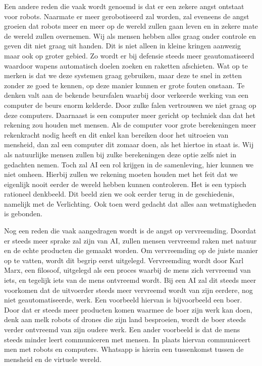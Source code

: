 \documentclass{article}
\begin{document}
Een andere reden die vaak wordt genoemd is dat er een zekere angst ontstaat voor robots. Naarmate er meer gerobotiseerd zal worden, zal eveneens de angst groeien dat robots meer en meer op de wereld zullen gaan leven en in zekere mate de wereld zullen overnemen. Wij als mensen hebben alles graag onder controle en geven dit niet graag uit handen. Dit is niet alleen in kleine kringen aanwezig maar ook op groter gebied. Zo wordt er bij defensie steeds meer geautomatiseerd waardoor wapens automatisch doelen zoeken en raketten afschieten. Wat op te merken is dat we deze systemen graag gebruiken, maar deze te snel in zetten zonder ze goed te kennen, op deze manier kunnen er grote fouten onstaan. Te denken valt aan de bekende beursfalen\cite{vriendofvijand} waarbij door verkeerde werking van een computer de beurs enorm kelderde. Door zulke falen vertrouwen we niet graag op deze computers. Daarnaast is een computer meer gericht op techniek dan dat het rekening zou houden met mensen. Als de computer voor grote berekeningen meer rekenkracht nodig heeft en dit enkel kan bereiken door het uitroeien van mensheid, dan zal een computer dit zomaar doen, als het hiertoe in staat is. Wij als natuurlijke mensen zullen bij zulke berekeningen deze optie zelfs niet in gedachten nemen. Toch zal AI een rol krijgen in de samenleving, hier kunnen we niet omheen. Hierbij zullen we rekening moeten houden met het feit dat we eigenlijk nooit eerder de wereld hebben kunnen controleren. Het is een typisch rationeel denkbeeld. Dit beeld zien we ook eerder terug in de geschiedenis, namelijk met de Verlichting. Ook toen werd gedacht dat alles aan wetmatigheden is gebonden.

Nog een reden die vaak aangedragen wordt is de angst op vervreemding. Doordat er steeds meer sprake zal zijn van AI, zullen mensen vervreemd raken met natuur en de echte producten die gemaakt worden. Om vervreemding op de juiste manier op te vatten, wordt dit begrip eerst uitgelegd. Vervreemding wordt door Karl Marx\cite{vriendofvijand}, een filosoof, uitgelegd als een proces waarbij de mens zich vervreemd van iets, en tegelijk iets van de mens ontvreemd wordt. Bij een AI zal dit steeds meer voorkomen dat de uitvoerder steeds meer vervreemd wordt van zijn eerdere, nog niet geautomatiseerde, werk. Een voorbeeld hiervan is bijvoorbeeld een boer. Door dat er steeds meer producten komen waarmee de boer zijn werk kan doen, denk aan melk robots of drones die zijn land besproeien, wordt de boer steeds verder ontvreemd van zijn oudere werk. Een ander voorbeeld is dat de mens steeds minder leert communiceren met mensen. In plaats hiervan communiceert men met robots en computers. Whatsapp is hierin een tussenkomst tussen de mensheid en de virtuele wereld. 
\end{document}
